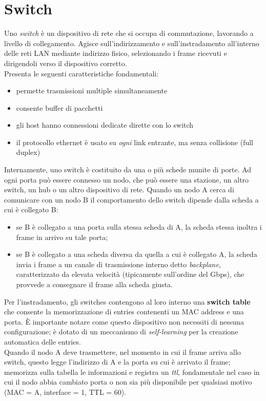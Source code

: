 \section{Switch}
Uno \textit{switch} è un dispositivo di rete che si occupa di commutazione, lavorando a livello di collegamento. Agisce sull'indirizzamento e sull'instradamento all'interno delle reti LAN mediante indirizzo fisico, selezionando i frame ricevuti e dirigendoli verso il dispositivo corretto.\\
Presenta le seguenti caratteristiche fondamentali:
\begin{itemize}
	\item permette trasmissioni multiple simultaneamente
	\item consente buffer di pacchetti
	\item gli host hanno connessioni dedicate dirette con lo switch
	\item il protocollo ethernet è usato su \textit{ogni} link entrante, ma senza collisione (full duplex)
\end{itemize}
Internamente, uno switch è costituito da una o più schede munite di porte. Ad ogni porta può essere connesso un nodo, che può essere una stazione, un altro switch, un hub o un altro dispositivo di rete.
Quando un nodo A cerca di comunicare con un nodo B il comportamento dello switch dipende dalla scheda a cui è collegato B:
\begin{itemize}
	\item se B è collegato a una porta sulla stessa scheda di A, la scheda stessa inoltra i frame in arrivo su tale porta;
	\item se B è collegato a una scheda diversa da quella a cui è collegato A, la scheda invia i frame a un canale di trasmissione interno detto \textit{backplane}, caratterizzato da elevata velocità (tipicamente sull'ordine del Gbps), che provvede a consegnare il frame alla scheda giusta.
\end{itemize}
Per l'instradamento, gli switches contengono al loro interno una \textbf{switch table} che consente la memorizzazione di entries contenenti un MAC address e una porta. È importante notare come questo dispositivo non necessiti di nessuna configurazione; è dotato di un meccanismo di \textit{self-learning} per la creazione automatica delle entries.\\
Quando il nodo A deve trasmettere, nel momento in cui il frame arriva allo switch, questo legge l'indirizzo di A e la porta su cui è arrivato il frame; memorizza sulla tabella le informazioni e registra un \textit{ttl}, fondamentale nel caso in cui il nodo abbia cambiato porta o non sia più disponibile per qualsiasi motivo (MAC = A, interface = 1, TTL = 60).\\
